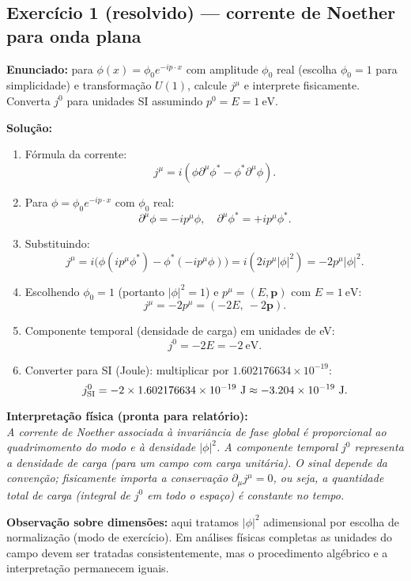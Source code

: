 \documentclass[12pt,a4paper]{article}
\begin{document}
\subsection{Exercício 1 (resolvido) — corrente de Noether para onda plana}
\textbf{Enunciado:} para $\phi(x)=\phi_0 e^{-ip\cdot x}$ com amplitude $\phi_0$ real (escolha $\phi_0=1$ para simplicidade) e transformação $U(1)$, calcule $j^\mu$ e interprete fisicamente. Converta $j^0$ para unidades SI assumindo $p^0=E=1\ \mathrm{eV}$.

\textbf{Solução:}
\begin{enumerate}
  \item Fórmula da corrente:
  \[
  j^\mu = i(\phi\partial^\mu\phi^* - \phi^*\partial^\mu\phi).
  \]
  \item Para $\phi=\phi_0 e^{-ip\cdot x}$ com $\phi_0$ real:
  \[
  \partial^\mu\phi = -i p^\mu\phi,\quad \partial^\mu\phi^* = +i p^\mu\phi^*.
  \]
  \item Substituindo:
  \[
  j^\mu = i\big(\phi(i p^\mu\phi^*) - \phi^*(-i p^\mu\phi)\big) = i(2i p^\mu|\phi|^2) = -2 p^\mu|\phi|^2.
  \]
  \item Escolhendo $\phi_0=1$ (portanto $|\phi|^2=1$) e $p^\mu=(E,\mathbf{p})$ com $E=1\ \mathrm{eV}$:
  \[
  j^\mu = -2 p^\mu = (-2E,\ -2\mathbf{p}).
  \]
  \item Componente temporal (densidade de carga) em unidades de eV:
  \[
  j^0 = -2E = -2\ \mathrm{eV}.
  \]
  \item Converter para SI (Joule): multiplicar por $1.602176634\times10^{-19}$:
  \[
  j^0_{\rm SI} = -2\times 1.602176634\times10^{-19}\ \mathrm{J} \approx -3.204\times10^{-19}\ \mathrm{J}.
  \]
\end{enumerate}

\textbf{Interpretação física (pronta para relatório):}\\
\emph{A corrente de Noether associada à invariância de fase global é proporcional ao quadrimomento do modo e à densidade $|\phi|^2$. A componente temporal $j^0$ representa a densidade de carga (para um campo com carga unitária). O sinal depende da convenção; fisicamente importa a conservação $\partial_\mu j^\mu=0$, ou seja, a quantidade total de carga (integral de $j^0$ em todo o espaço) é constante no tempo.}

\vspace{6pt}
\textbf{Observação sobre dimensões:} aqui tratamos $|\phi|^2$ adimensional por escolha de normalização (modo de exercício). Em análises físicas completas as unidades do campo devem ser tratadas consistentemente, mas o procedimento algébrico e a interpretação permanecem iguais.
\end{document}
